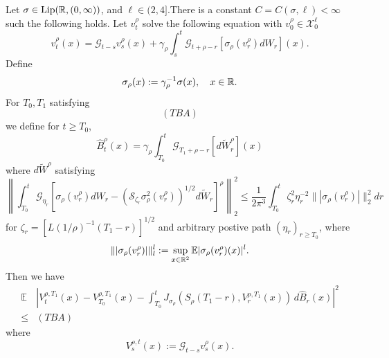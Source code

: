 \begin{proposition}
    Let $\sigma \in \text{Lip}(\mathbb{R}, (0,\infty))$, and $\ell\in(2,4]$.There is a constant $C = C(\sigma,\ell) < \infty$ such the following holds. Let $v_t^{\rho}$ solve the following equation with $v_0^{\rho} \in \mathscr{X}_0^{\ell}$
    \[
    v_t^{\rho}(x) = \mathcal{G}_{t-s}v_s^{\rho}(x) + \gamma_{\rho}\int_s^t\mathcal{G}_{t+\rho-r}[\sigma_{\rho}(v_r^{\rho})dW_r](x).
    \]
    Define
    \[
    \sigma_{\rho}(x) := \gamma_{\rho}^{-1}\sigma(x),\quad x\in \mathbb{R}.
    \]
    For $T_0,T_1$ satisfying
    \[
    (TBA)
    \]
    we define for $t\geq T_0$,
    \[
    \widehat{B}_t^{\rho}(x) = \gamma_{\rho}\int_{T_0}^t \mathcal{G}_{T_1+\rho-r}[d\widetilde{W}_r^{\rho}](x)
    \]
    where $d\widetilde{W}^{\rho}$ satisfying
    \[
    \left\lVert \int_{T_0}^t\mathcal{G}_{\eta_r}[\sigma_{\rho}(v_r^{\rho})dW_r - (\mathcal{S}_{\zeta_r}\sigma_{\rho}^2(v_r^{\rho}))^{1/2}d\widetilde{W}_r]^{\rho}\right\rVert_2^2 \leq \dfrac{1}{2\pi^3}\int_{T_0}^t \zeta_r^2\eta_r^{-2}\lVert|\sigma_{\rho}(v_r^{\rho})|\rVert_2^2dr
    \]
    for $\zeta_r = [L(1/\rho)^{-1}(T_1-r)]^{1/2}$ and arbitrary postive path $(\eta_r)_{r\geq T_0}$, where
    \[
    \lVert|\sigma_{\rho}(v_r^{\rho})|\rVert_l^l :=\sup_{x\in\mathbb{R}^2}\mathbb{E}|\sigma_{\rho}(v_r^{\rho})(x)|^l.
    \]
    Then we have
    \[\begin{aligned}
\mathbb{E}
&\left|
V_t^{\rho,T_1}(x)
-
V_{T_0}^{\rho,T_1}(x)
-
\int_{T_0}^{t}
J_{\sigma_{\rho}}\left(
    S_{\rho}(T_1-r),
    V_r^{\rho,T_1}(x)
\right)
\,d\widehat{B}_r(x)
\right|^2 \\
\leq
&(TBA)
\end{aligned}
\]
where
\[
V_s^{\rho,t}(x):= \mathcal{G}_{t-s}v_s^{\rho}(x).
\]
\end{proposition}
